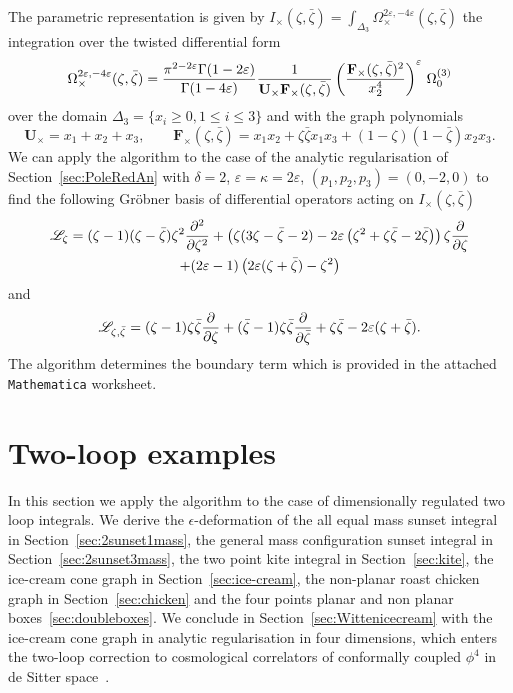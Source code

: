 \documentclass[a4paper,12pt]{article}
\numberwithin{equation}{section}
\numberwithin{figure}{section}
\begin{document}
The parametric representation is given by
$
  I_\times(\zeta,\bar\zeta)= \int_{\Delta_3}   \Omega_\times^{2\varepsilon,-4\varepsilon}(\zeta,\bar\zeta)
$ the integration over the twisted differential form
\begin{equation}
  \Omega_\times^{2\varepsilon,-4\varepsilon}(\zeta,\bar\zeta)={\pi^{2-2\varepsilon}\Gamma(1-2\varepsilon)\over\Gamma(1-4\varepsilon)} {1\over \textbf{U}_\times
    \textbf{F}_\times (\zeta,\bar\zeta)} \left(
    \textbf{F}_\times (\zeta,\bar\zeta)^{2}\over  x_2^{4}\right)^\varepsilon  \, \Omega_0^{(3)}
\end{equation}
over the domain $\Delta_3=\{x_i\geq0, 1\leq i\leq 3\}$ and with the graph polynomials
\begin{equation}
  \textbf{U}_\times= x_1+x_2+x_3,  \qquad \textbf{F}_\times (\zeta,\bar\zeta)= x_1x_2+
  \zeta\bar\zeta x_1x_3+ (1-\zeta)(1-\bar\zeta)x_2x_3  .
\end{equation}
We can apply the algorithm to the case of the analytic regularisation
of Section~\ref{sec:PoleRedAn} 
with $\delta=2$, $\varepsilon=\kappa=2\varepsilon$, $(p_1,p_2,p_3)=(0,-2,0)$
to find the following Gr\"obner basis of  differential operators
acting on $I_\times(\zeta,\bar\zeta)$
\begin{multline}
  \mathscr{L}_\zeta= (\zeta -1) (\zeta -\bar\zeta) \zeta ^2{\partial^2\over\partial\zeta^2}  +
   \left(\zeta (3 \zeta -\bar\zeta-2)-2\varepsilon  \left(\zeta ^2+\zeta 
   \bar\zeta-2 \bar\zeta\right) \right) \zeta {\partial\over\partial\zeta}\cr+(2 \varepsilon -1) \left(2 \varepsilon  (\zeta +\bar\zeta)-\zeta ^2\right)
\end{multline}
and
\begin{equation}
  \mathscr{L}_{\zeta,\bar\zeta}= (\zeta -1)\zeta\bar\zeta{\partial\over\partial\zeta}  +
   (\bar\zeta -1)\zeta\bar\zeta{\partial\over\partial\bar\zeta}+\zeta\bar\zeta-2\varepsilon(\zeta+\bar\zeta).
 \end{equation}
 The algorithm determines the boundary term which is provided in the
 attached {\tt Mathematica} worksheet. 

\section{Two-loop examples}\label{sec:twoloop}
%
In this section we apply the algorithm to  the case of dimensionally
 regulated two loop integrals. We derive the $\epsilon$-deformation of
the all equal mass sunset integral in Section~\ref{sec:2sunset1mass}, the general mass configuration
sunset integral in Section~\ref{sec:2sunset3mass}, the two point kite
integral in Section~\ref{sec:kite}, the ice-cream cone
graph in Section~\ref{sec:ice-cream}, the non-planar roast chicken
graph in Section~\ref{sec:chicken} and the four points planar
and non planar boxes~\ref{sec:doubleboxes}. We conclude in  Section~\ref{sec:Wittenicecream}
with the ice-cream cone graph in  analytic regularisation in four
dimensions, which enters the two-loop correction to cosmological
correlators of  conformally coupled $\phi^4$  in  de
 Sitter space~\cite{Chowdhury:2023arc}.
\end{document}
